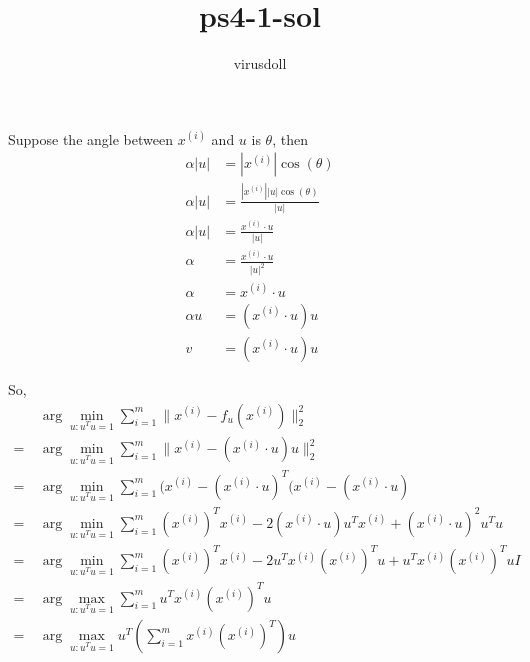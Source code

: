 \documentclass[11pt, a4paper]{article}
\title{ps4-1-sol}
\author{virusdoll}
\begin{document}
    \maketitle

    Suppose the angle between $x^{(i)}$ and $u$ is $\theta$, then
    \begin{align*}
        \alpha | u | & = | x^{(i)} | \cos(\theta) \\
        \alpha | u | & = \frac{|x^{(i)}| |u| \cos(\theta)}{|u|} \\
        \alpha | u | & = \frac{x^{(i)} \cdot u}{|u|} \\
        \alpha & = \frac{x^{(i)} \cdot u}{|u|^2} \\
        \alpha & = x^{(i)} \cdot u \\
        \alpha u & = (x^{(i)} \cdot u) u \\
        v & = (x^{(i)} \cdot u) u
    \end{align*}

    So,
    \begin{align*}
        & \ \arg \min_{u:u^Tu=1} \sum^m_{i=1} \| x^{(i)} - f_u(x^{(i)}) \|^2_2 \\
        = & \ \arg \min_{u:u^Tu=1} \sum^m_{i=1} \| x^{(i)} - (x^{(i)} \cdot u) u \|^2_2 \\
        = & \ \arg \min_{u:u^Tu=1} \sum^m_{i=1}
            (x^{(i)} - (x^{(i)} \cdot u)^T (x^{(i)} - (x^{(i)} \cdot u) \\
        = & \ \arg \min_{u:u^Tu=1} \sum^m_{i=1}
            (x^{(i)})^T x^{(i)} - 2 (x^{(i)} \cdot u) u^T x^{(i)} + (x^{(i)} \cdot u)^2 u^Tu \\
        = & \ \arg \min_{u:u^Tu=1} \sum^m_{i=1}
            (x^{(i)})^T x^{(i)} - 2 u^T x^{(i)} (x^{(i)})^T u + u^T x^{(i)} (x^{(i)})^T u I \\
        = & \ \arg \max_{u:u^Tu=1} \sum^m_{i=1} u^T x^{(i)} (x^{(i)})^T u \\
        = & \ \arg \max_{u:u^Tu=1} u^T ( \sum^m_{i=1} x^{(i)} (x^{(i)})^T ) u
    \end{align*}
\end{document}
